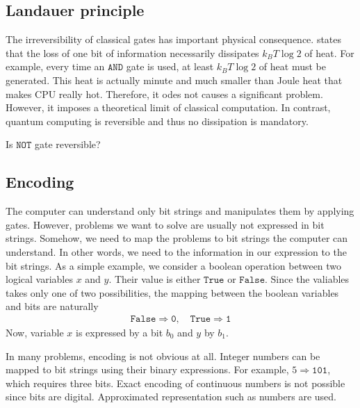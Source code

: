 \documentclass[letterpaper,10pt,english]{jupyterBook}
\begin{document}
\subsection{Landauer principle}
\label{\detokenize{computation/ccomp:landauer-principle}}
\sphinxAtStartPar
The irreversibility of classical gates has important physical consequence.   states that the loss of one bit of information necessarily dissipates \(k_B T \log 2\) of heat. For example, every time an  \(\texttt{AND}\) gate is used, at least \(k_B T \log 2\) of heat must be generated. This heat is actually minute and much smaller than Joule heat that makes CPU really hot. Therefore, it odes not causes a significant problem.  However, it imposes a theoretical limit of classical computation.  In contrast, quantum computing is reversible and thus no dissipation is mandatory.

\sphinxAtStartPar
{}  Is \(\texttt{NOT}\) gate reversible?


\subsection{Encoding}
\label{\detokenize{computation/ccomp:encoding}}
\sphinxAtStartPar
The computer can understand only bit strings and manipulates them by applying gates.  However, problems we want to solve are usually not expressed in bit strings.  Somehow, we need to map the problems to bit strings the computer can understand. In other words, we need to  the information in our expression to the bit strings. As a simple example, we consider a boolean operation between two logical variables \(x\) and \(y\).  Their value is either \(\texttt{True}\) or \(\texttt{False}\).   Since the valiables takes only one of two possibilities, the mapping between the boolean variables and bits are naturally
\begin{equation*}
\begin{split}
\texttt{False} \Rightarrow \texttt{0}, \quad \texttt{True} \Rightarrow \texttt{1}
\end{split}
\end{equation*}
\sphinxAtStartPar
Now, variable \(x\) is expressed by a bit \(b_0\) and \(y\)  by \(b_1\).

\sphinxAtStartPar
In many problems, encoding is not obvious at all.  Integer numbers can be mapped to bit strings using their binary expressions.  For example, \(5 \Rightarrow \texttt{101}\), which requires three bits.  Exact encoding of continuous numbers is not possible  since bits are digital.  Approximated representation such as  numbers are used.
\end{document}
